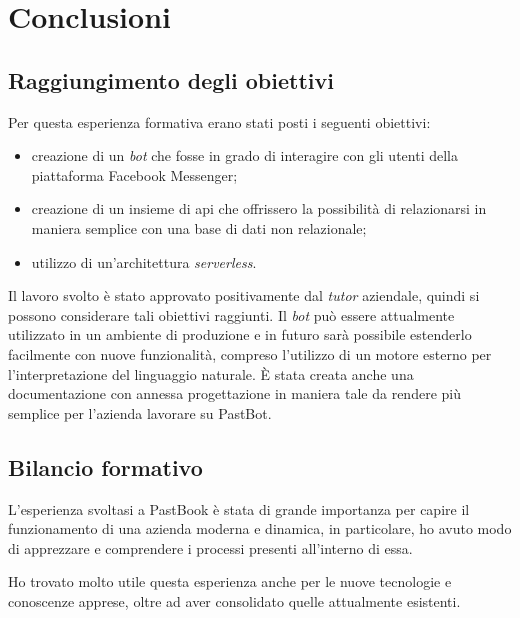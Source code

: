 
\chapter{Conclusioni}

\section{Raggiungimento degli obiettivi}

Per questa esperienza formativa erano stati posti i seguenti obiettivi:
\begin{itemize}
  \item creazione di un \textit{bot} che fosse in grado di interagire con gli
utenti della piattaforma Facebook Messenger;
  \item creazione di un insieme di \gls{api} che offrissero la possibilità di
relazionarsi in maniera semplice con una base di dati non relazionale;
  \item utilizzo di un'architettura \textit{serverless}.
\end{itemize}

Il lavoro svolto è stato approvato positivamente dal \textit{tutor} aziendale,
quindi si possono considerare tali obiettivi raggiunti.
Il \textit{bot} può essere attualmente utilizzato in un ambiente di produzione e
in futuro sarà possibile estenderlo facilmente con nuove funzionalità, compreso
l'utilizzo di un motore esterno per l'interpretazione del linguaggio naturale.
È stata creata anche una documentazione con annessa progettazione in maniera
tale da rendere più semplice per l'azienda lavorare su PastBot.

\section{Bilancio formativo}

L'esperienza svoltasi a PastBook è stata di grande importanza per capire il
funzionamento di una azienda moderna e dinamica, in particolare, ho avuto modo
di apprezzare e comprendere i processi presenti all'interno di essa.


Ho trovato molto utile questa esperienza anche per le nuove tecnologie e
conoscenze apprese, oltre ad aver consolidato quelle attualmente esistenti.
